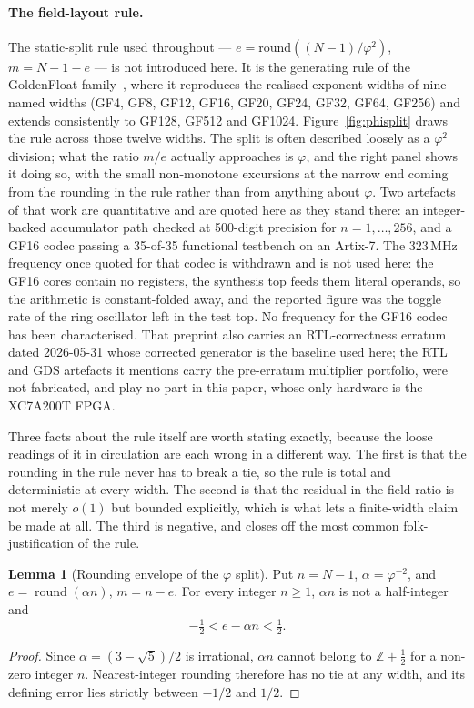 \documentclass[11pt]{article}
\theoremstyle{definition}
\newtheorem{lemma}[theorem]{Lemma}
\begin{document}
\paragraph{The field-layout rule.} The static-split rule used throughout ---
$e=\mathrm{round}((N-1)/\varphi^{2})$, $m=N-1-e$ --- is not introduced here. It
is the generating rule of the GoldenFloat family~\cite{goldenfloat}, where it
reproduces the realised exponent widths of nine named widths (GF4, GF8, GF12,
GF16, GF20, GF24, GF32, GF64, GF256) and extends consistently to GF128, GF512
and GF1024. Figure~\ref{fig:phisplit} draws the rule across those twelve widths.
The split is often described loosely as a $\varphi^{2}$ division; what the ratio
$m/e$ actually approaches is $\varphi$, and the right panel shows it doing so,
with the small non-monotone excursions at the narrow end coming from the rounding
in the rule rather than from anything about $\varphi$. Two artefacts of that work
are quantitative and are quoted here as they stand there: an integer-backed
accumulator path checked at 500-digit precision for $n=1,\dots,256$, and a GF16
codec passing a 35-of-35 functional testbench on an Artix-7. The $323$\,MHz
frequency once quoted for that codec is withdrawn and is not used here: the GF16
cores contain no registers, the synthesis top feeds them literal operands, so the
arithmetic is constant-folded away, and the reported figure was the toggle rate of
the ring oscillator left in the test top. No frequency for the GF16 codec has been
characterised. That preprint also carries an RTL-correctness erratum dated
2026-05-31 whose corrected generator is the baseline used here; the RTL and GDS
artefacts it mentions carry the pre-erratum multiplier portfolio, were not
fabricated, and play no part in this paper, whose only hardware is the XC7A200T
FPGA.

Three facts about the rule itself are worth stating exactly, because the loose
readings of it in circulation are each wrong in a different way. The first is that
the rounding in the rule never has to break a tie, so the rule is total and
deterministic at every width. The second is that the residual in the field ratio
is not merely $o(1)$ but bounded explicitly, which is what lets a finite-width
claim be made at all. The third is negative, and closes off the most common
folk-justification of the rule.

\begin{lemma}[Rounding envelope of the $\varphi$ split]
\label{lem:phi-rounding-envelope}
Put $n=N-1$, $\alpha=\varphi^{-2}$, and $e=\operatorname{round}(\alpha n)$,
$m=n-e$. For every integer $n\geq1$, $\alpha n$ is not a half-integer and
\[
 -\tfrac12 < e-\alpha n < \tfrac12 .
\]
\end{lemma}
\begin{proof}
Since $\alpha=(3-\sqrt5)/2$ is irrational, $\alpha n$ cannot belong to
$\mathbb{Z}+\tfrac12$ for a non-zero integer $n$. Nearest-integer rounding
therefore has no tie at any width, and its defining error lies strictly between
$-1/2$ and $1/2$.
\end{proof}
\end{document}
